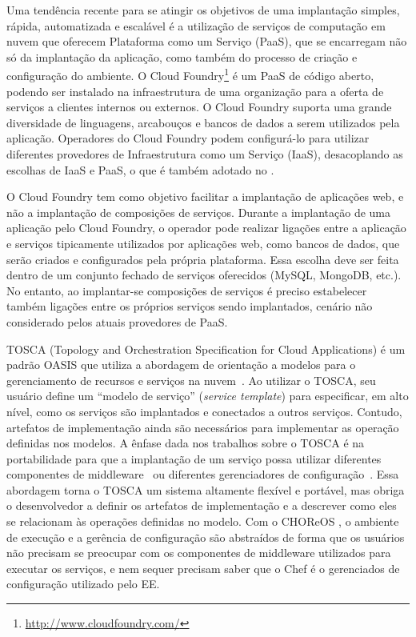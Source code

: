 Uma tendência recente para se atingir os objetivos de uma implantação simples, rápida, automatizada e escalável é a utilização de serviços de computação em nuvem que oferecem Plataforma como um Serviço (PaaS), que se encarregam não só da implantação da aplicação, como também do processo de criação e configuração do ambiente. O Cloud Foundry\footnote{\url{http://www.cloudfoundry.com/}} é um PaaS de código aberto, podendo ser instalado na infraestrutura de uma organização para a oferta de serviços a clientes internos ou externos. O Cloud Foundry suporta uma grande diversidade de linguagens, arcabouços e bancos de dados a serem utilizados pela aplicação. Operadores do Cloud Foundry podem configurá-lo para utilizar diferentes provedores de Infraestrutura como um Serviço (IaaS), desacoplando as escolhas de IaaS e PaaS, o que é também adotado no \ee. 

O Cloud Foundry tem como objetivo facilitar a implantação de aplicações web, e não a implantação de composições de serviços. Durante a implantação de uma aplicação pelo Cloud Foundry, o operador pode realizar ligações entre a aplicação e serviços tipicamente utilizados por aplicações web, como bancos de dados, que serão criados e configurados pela própria plataforma. Essa escolha deve ser feita dentro de um conjunto fechado de serviços oferecidos (MySQL, MongoDB, etc.). No entanto, ao implantar-se composições de serviços é preciso estabelecer também ligações entre os próprios serviços sendo implantados, cenário não considerado pelos atuais provedores de PaaS.


TOSCA (Topology and Orchestration Specification for Cloud Applications)
é um padrão OASIS que utiliza a abordagem de orientação a modelos para
o gerenciamento de recursos e serviços na nuvem~\cite{Wettinger2013Tosca}.
Ao utilizar o TOSCA, seu usuário define um ``modelo de serviço'' (\emph{service template})
para especificar, em alto nível, como os serviços são implantados e conectados a outros serviços.
Contudo, artefatos de implementação ainda são necessários
para implementar as operação definidas nos modelos.
A ênfase dada nos trabalhos sobre o TOSCA é na portabilidade
para que a implantação de um serviço possa utilizar diferentes
componentes de middleware~\cite{Wettinger2013ExtensiblePaaS} 
ou diferentes gerenciadores de configuração~\cite{Wettinger2013Tosca}.
Essa abordagem torna o TOSCA um sistema altamente flexível e portável,
mas obriga o desenvolvedor a definir os
artefatos de implementação e a descrever como eles se
relacionam às operações definidas no modelo.
Com o CHOReOS \ee, o ambiente de execução e a gerência de configuração são
abstraídos de forma que os usuários não precisam se preocupar
com os componentes de middleware utilizados para executar os serviços,
e nem sequer precisam saber que o Chef é o gerenciados de configuração
utilizado pelo EE.


